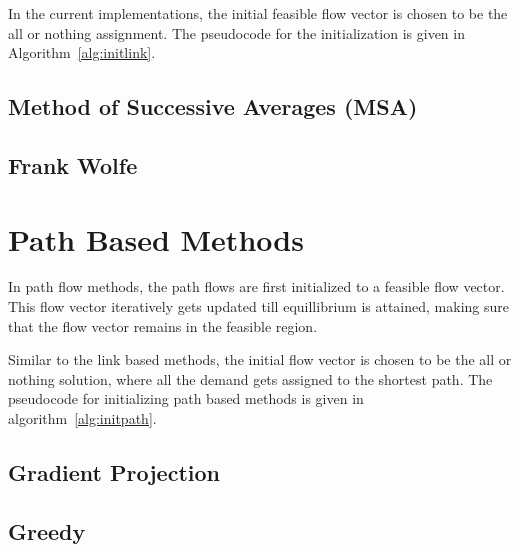 In the current implementations, the initial feasible flow
vector is chosen to be the all or nothing assignment. The
pseudocode for the initialization is given in Algorithm~\ref{alg:initlink}.



\subsection{Method of Successive Averages (MSA)}


\subsection{Frank Wolfe}


\section{Path Based Methods}
In path flow methods, the path flows are first initialized to a
feasible flow vector. This flow vector iteratively gets updated
till equillibrium is attained, making sure that the flow
vector remains in the feasible region.

Similar to the link based methods, the initial flow vector is
chosen to be the all or nothing solution, where all the demand
gets assigned to the shortest path. The pseudocode for initializing
path based methods is given in algorithm~\ref{alg:initpath}.

\subsection{Gradient Projection}


\subsection{Greedy}

